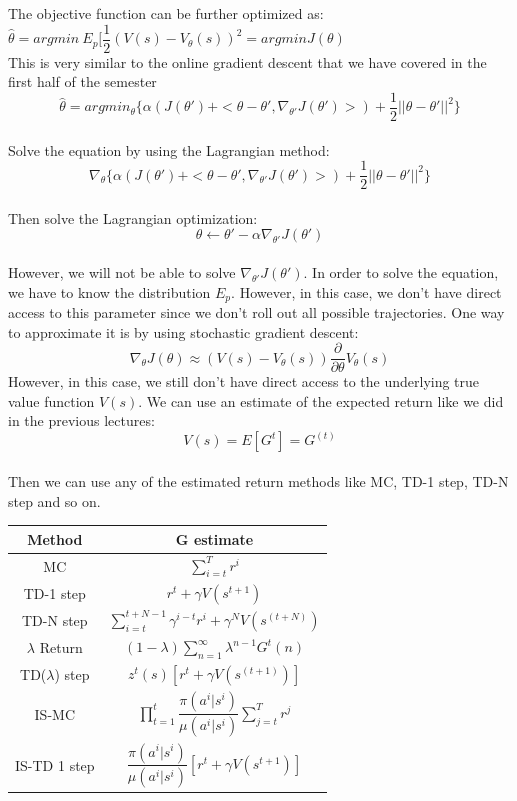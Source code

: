 \documentclass[11pt]{article}
\begin{document}
The objective function can be further optimized as:  $\hat{\theta} = argmin \: E_p [\dfrac{1}{2} (V(s) - V_{\theta}(s))^2 = argmin J(\theta)$\\ 

This is very similar to the online gradient descent that we have covered in the first half of the semester\\
$$\hat{\theta} = argmin_\theta \{ \alpha (J(\theta') + <\theta - \theta',\nabla_{\theta'} J(\theta')>) + \dfrac{1}{2} ||\theta - \theta' ||^2 \}$$ \\
Solve the equation by using the Lagrangian method:$$\nabla_\theta \{ \alpha (J(\theta') + <\theta - \theta',\nabla_{\theta'} J(\theta')>) + \dfrac{1}{2} ||\theta - \theta' ||^2 \}$$\\
Then solve the Lagrangian optimization:
$$\theta \leftarrow \theta' - \alpha \nabla_{\theta'} J(\theta')$$ \\

However, we will not be able to solve $\nabla_{\theta'} J(\theta')$. In order to solve the equation, we have to know the distribution $E_p$. However, in this case, we don't have direct access to this parameter since we don't roll out all possible trajectories. One way to approximate it is by using stochastic gradient descent:
$$\nabla_\theta J(\theta) \approx {(V(s) - V_\theta(s)) \dfrac{\partial}{\partial \theta}V_\theta(s)}$$
However, in this case, we still don't have direct access to the underlying true value function $V(s)$. We can use an estimate of the expected return like we did in the previous lectures:
$$V(s) = E[G^{t}] = G^{(t)}$$\\
Then we can use any of the estimated return methods like MC, TD-1 step, TD-N step and so on. 
\begin{center}
\begin{tabular}{ |c|c| } 
\hline
Method & G estimate  \\
\hline
 MC & $\sum_{i=t}^T r^i$ \\ 
 TD-1 step & $r^t + \gamma V(s^{t+1})$ \\ 
 TD-N step & $\sum_{i=t}^{t+N-1} \gamma^{i-t} r^i + \gamma^N V(s^(t+N)) $ \\ 
 $\lambda$ Return & $(1-\lambda)\sum_{n=1}^\infty \lambda^{n-1} G^t(n)$ \\ 
 TD($\lambda$) step & $z^t(s) [r^t + \gamma V(s^(t+1))]$ \\ 
 IS-MC & $\prod_{t=1}^t \dfrac{\pi(a^i | s^i)}{\mu(a^i | s^i)} \sum_{j=t}^T r^j$ \\ 
 IS-TD 1 step & $\dfrac{\pi(a^i | s^i)}{\mu(a^i | s^i)} [r^t + \gamma V(s^{t+1})]$ \\ 
\hline
\end{tabular}
\end{center}
\end{document}
